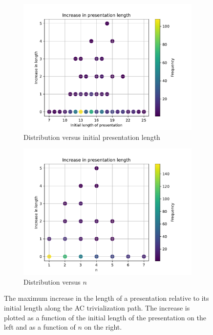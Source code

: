 \begin{figure}
	\centering
	\begin{subfigure}[b]{0.5\textwidth}
		\includegraphics[width=\textwidth]{fig/gs_length_increase_vs_length.pdf}
		\caption{Distribution versus initial presentation length}
		\label{fig:gs_length_increase_vs_length}
	\end{subfigure}%
	\begin{subfigure}[b]{0.5\textwidth}
		\centering
		\includegraphics[width=1.1\textwidth]{fig/gs_length_increase_vs_n.pdf}
		\caption{Distribution versus $n$}
		\label{fig:gs_length_increase_vs_n}
	\end{subfigure}
	\caption{The maximum increase in the length of a presentation relative to its initial length along the AC trivialization path. The increase is plotted as a function of the initial length of the presentation on the left and as a function of $n$ on the right.} \label{fig:gs_length_increase}
\end{figure}

